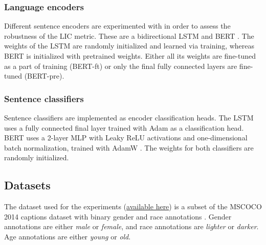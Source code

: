 
\subsubsection{Language encoders}
Different sentence encoders are experimented with in order to assess the robustness of the LIC metric. These are a bidirectional LSTM \cite{lstm} and BERT \cite{bert}. The weights of the LSTM are randomly initialized and learned via training, whereas BERT is initialized with pretrained weights. Either all its weights are fine-tuned as a part of training (BERT-ft) or only the final fully connected layers are fine-tuned (BERT-pre).
\subsubsection{Sentence classifiers}
Sentence classifiers are implemented as encoder classification heads. The LSTM uses a fully connected final layer trained with Adam \cite{adam} as a classification head. BERT uses a 2-layer MLP with Leaky ReLU activations and one-dimensional batch normalization, trained with AdamW \cite{adamw}. The weights for both classifiers are randomly initialized.


\subsection{Datasets} 
\label{ssec:datasets}
The dataset used for the experiments (\href{https://drive.google.com/drive/folders/1PI03BqcnhdXZi2QY9PUHzWn4cxgdonT-}{available here}) is a subset of the MSCOCO 2014 captions dataset \cite{mscoco} with binary gender and race annotations \cite{zhao}. Gender annotations are either \textit{male} or \textit{female}, and race annotations are \textit{lighter} or \textit{darker}. Age annotations are either \textit{young} or \textit{old}.

